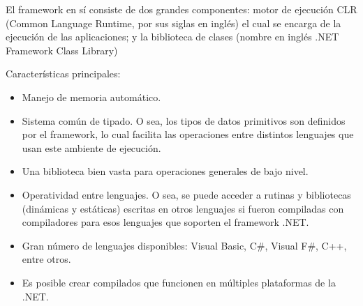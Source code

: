 El framework en sí consiste de dos grandes componentes: motor de ejecución CLR (Common Language Runtime, por sus siglas en inglés) el cual se encarga de la ejecución de las aplicaciones; y la biblioteca de clases (nombre en inglés .NET Framework Class Library)~\cite{netframework}

\vspace{2pt}
Características principales:
\begin{itemize}
    \item Manejo de memoria automático.
    \item Sistema común de tipado. O sea, los tipos de datos primitivos son definidos por el framework, lo cual facilita las operaciones entre distintos lenguajes que usan este ambiente de ejecución.
    \item Una biblioteca bien vasta para operaciones generales de bajo nivel.
    \item Operatividad entre lenguajes. O sea, se puede acceder a rutinas y bibliotecas (dinámicas y estáticas) escritas en otros lenguajes si fueron compiladas con compiladores para esos lenguajes que soporten el framework .NET.
    \item Gran número de lenguajes disponibles: Visual Basic, C\#, Visual F\#, C++, entre otros.
    \item Es posible crear compilados que funcionen en múltiples plataformas de la .NET.
\end{itemize}